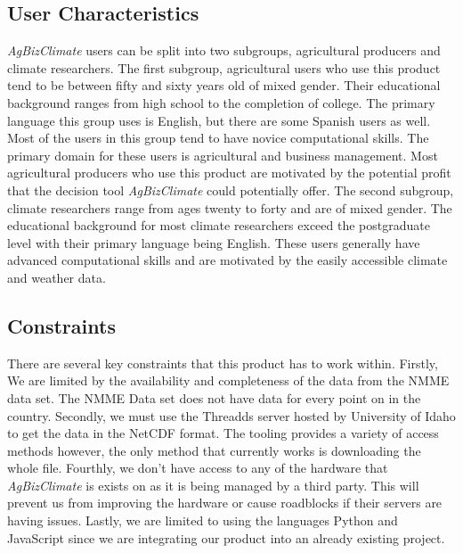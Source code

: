 \documentclass[onecolumn, draftclsnofoot,10pt, compsoc]{article}
\begin{document}
	\subsection{User Characteristics}
		\textit{AgBizClimate} users can be split into two subgroups, agricultural producers and climate researchers. The first subgroup, agricultural users who use this product tend to be between fifty and sixty years old of mixed gender. Their educational background ranges from high school to the completion of college. The primary language this group uses is English, but there are some Spanish users as well. Most of the users in this group tend to have novice computational skills. The primary domain for these users is agricultural and business management. Most agricultural producers who use this product are motivated by the potential profit that the decision tool \textit{AgBizClimate} could potentially offer. The second subgroup, climate researchers range from ages twenty to forty and are of mixed gender. The educational background for most climate researchers  exceed the postgraduate level with their primary language being English. These users generally have advanced computational skills and are motivated by the easily accessible climate and weather data.\\

	\subsection{Constraints}
		There are several key constraints that this product has to work within. Firstly, We are limited by the availability and completeness of the data from the NMME data set. The NMME Data set does not have data for every point on in the country. Secondly, we must use the Threadds server hosted by University of Idaho to get the data in the NetCDF format. The tooling provides a variety of access methods however, the only method that currently works is downloading the whole file. Fourthly, we don’t have access to any of the hardware that \textit{AgBizClimate} is exists on as it is being managed by a third party. This will prevent us from improving the hardware or cause roadblocks if their servers are having issues. Lastly, we are limited to using the languages Python and JavaScript since we are integrating our product into an already existing project.\\
\end{document}
